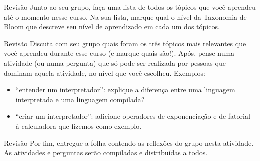 \documentclass{beamer}
\begin{document}
\begin{frame}[fragile]{Revisão}
  \centering
  \Large
  Junto ao seu grupo, faça uma lista de todos os tópicos que você aprendeu até o
  momento nesse curso. Na sua lista, marque qual o nível da Taxonomia de Bloom
  que descreve seu nível de aprendizado em cada um dos tópicos.
\end{frame}

\begin{frame}[fragile]{Revisão}
  \centering
  \large
  Discuta com seu grupo quais foram os três tópicos mais relevantes que você
  aprendeu durante esse curso (e marque quais são!). Após, pense numa atividade
  (ou numa pergunta) que só pode ser realizada por pessoas que dominam aquela
  atividade, no nível que você escolheu. Exemplos:
  \begin{itemize}
    \item ``entender um interpretador'': explique a diferença entre uma
  linguagem interpretada e uma linguagem compilada?
    \item ``criar um interpretador'': adicione operadores de exponenciação e de
      fatorial à calculadora que fizemos como exemplo.
  \end{itemize}
\end{frame}

\begin{frame}[fragile]{Revisão}
  \centering
  \Large
  Por fim, entregue a folha contendo as reflexões do grupo nesta atividade. As
  atividades e perguntas serão compiladas e distribuídas a todos.
\end{frame}
\end{document}
